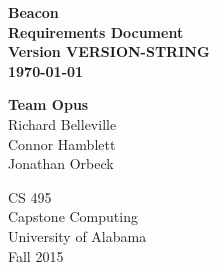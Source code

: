 \begin{titlepage}
    \begin{center}
        \vspace*{50mm}
        \Huge
        \textbf{ Beacon } \\
        \textbf{ Requirements Document } \\
        \textbf{ Version VERSION-STRING } \\
        \textbf{ \today }
        \vspace{10mm}

        \Huge \textbf{Team Opus} \\
        \vspace{2mm}
        \Large Richard Belleville \\
        \Large Connor Hamblett \\
        \Large Jonathan Orbeck
        \vspace{30mm}

        \huge
        CS 495 \\
        Capstone Computing \\
        University of Alabama \\
        Fall 2015
    \end{center}
\end{titlepage}
